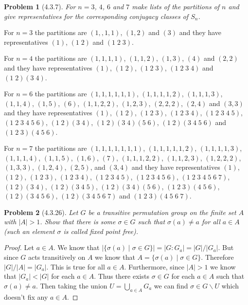 \documentclass{article}
\newtheorem{problem}{Problem}
\begin{document}
\begin{problem}[4.3.7]
\label{partitions}
For $n = 3$, $4$, $6$ and $7$ make lists of the partitions of $n$ and give representatives for the corresponding conjugacy classes of $S_n$.
\end{problem}

For $n=3$ the partitions are $(1,,1,1)$, $(1,2)$ and $(3)$ and they have representatives $(1)$, $(1 \; 2)$ and $(1 \; 2 \; 3)$.

For $n=4$ the partitions are $(1,1,1,1)$, $(1,1,2)$, $(1,3)$, $(4)$ and $(2,2)$ and they have representatives $(1)$, $(1 \; 2)$, $(1 \; 2 \; 3)$, $(1 \; 2 \; 3 \; 4)$ and $(1 \; 2)(3 \; 4)$.

For $n=6$ the partitions are $(1,1,1,1,1,1)$, $(1,1,1,1,2)$, $(1,1,1,3)$, $(1,1,4)$, $(1,5)$, $(6)$, $(1,1,2,2)$, $(1,2,3)$, $(2,2,2)$, $(2,4)$ and $(3,3)$ and they have representatives $(1)$, $(1 \; 2)$, $(1 \; 2 \; 3)$, $(1 \; 2 \; 3 \; 4)$, $(1 \; 2 \; 3 \; 4 \; 5)$, $(1 \; 2 \; 3 \; 4 \; 5 \; 6)$, $(1 \; 2)(3 \; 4)$, $(1 \; 2)(3 \; 4)(5 \; 6)$, $(1 \; 2)(3 \; 4 \; 5 \; 6)$ and $(1 \; 2 \; 3)(4 \; 5 \; 6)$.

For $n=7$ the partitions are $(1,1,1,1,1,1,1)$, $(1,1,1,1,1,2)$, $(1,1,1,1,3)$, $(1,1,1,4)$, $(1,1,5)$, $(1,6)$, $(7)$, $(1,1,1,2,2)$, $(1,1,2,3)$, $(1,2,2,2)$, $(1,3,3)$, $(1,2,4)$, $(2,5)$, and $(3,4)$ and they have representatives $(1)$, $(1 \; 2)$, $(1 \; 2 \; 3)$, $(1 \; 2 \; 3 \; 4)$, $(1 \; 2 \; 3 \; 4 \; 5)$, $(1 \; 2 \; 3 \; 4 \; 5 \; 6)$, $(1 \; 2 \; 3 \; 4 \; 5 \; 6 \; 7)$, $(1 \; 2)(3 \; 4)$, $(1 \; 2)(3 \; 4 \; 5)$, $(1 \; 2)(3 \; 4)(5 \; 6)$, $(1 \; 2 \; 3)(4 \; 5 \; 6)$, $(1 \; 2)(3 \; 4 \; 5 \; 6)$, $(1 \; 2)(3 \; 4 \; 5 \; 6 \; 7)$ and $(1 \; 2 \; 3)(4 \; 5 \; 6 \; 7)$.

\begin{problem}[4.3.26]
Let $G$ be a transitive permutation group on the finite set $A$ with $|A| > 1$. Show that there is some $\sigma \in G$ such that $\sigma(a) \neq a$ for all $a \in A$ (such an element $\sigma$ is called \emph{fixed point free}).
\end{problem}
\begin{proof}
Let $a \in A$. We know that $|\{\sigma(a) \mid \sigma \in G\}| = |G : G_a| = |G|/|G_a|$. But since $G$ acts transitively on $A$ we know that $A = \{\sigma(a) \mid \sigma \in G\}$. Therefore $|G|/|A| = |G_a|$. This is true for all $a \in A$. Furthermore, since $|A| > 1$ we know that $|G_a| < |G|$ for each $a \in A$. Thus there exists $\sigma \in G$ for each $a \in A$ such that $\sigma(a) \neq a$. Then taking the union $U = \bigcup_{a \in A} G_a$ we can find $\sigma \in G \backslash U$ which doesn't fix any $a \in A$.
\end{proof}
\end{document}
